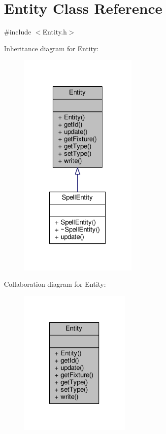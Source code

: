 \hypertarget{class_entity}{\section{Entity Class Reference}
\label{class_entity}
}


{\ttfamily \#include $<$Entity.\-h$>$}



Inheritance diagram for Entity\-:
\nopagebreak
\begin{figure}[H]
\begin{center}
\leavevmode
\includegraphics[width=164pt]{class_entity__inherit__graph}
\end{center}
\end{figure}


Collaboration diagram for Entity\-:
\nopagebreak
\begin{figure}[H]
\begin{center}
\leavevmode
\includegraphics[width=154pt]{class_entity__coll__graph}
\end{center}
\end{figure}

